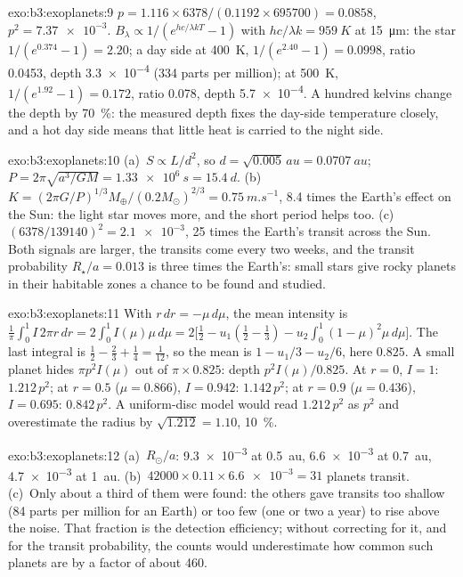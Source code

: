 \begin{solution}{exo:b3:exoplanets:9}
$p = 1.116\times6378/(0.1192\times695700) = 0.0858$, $p^2 = \num{7.37e-3}$.
$B_\lambda \propto 1/(e^{hc/\lambda kT} - 1)$ with $hc/\lambda k =
\qty{959}{K}$ at \qty{15}{\micro m}: the star $1/(e^{0.374} - 1) = 2.20$;
a day side at \qty{400}{K}, $1/(e^{2.40} - 1) = 0.0998$, ratio \num{0.0453},
depth \num{3.3e-4} (334 parts per million); at \qty{500}{K}, $1/(e^{1.92} -
1) = 0.172$, ratio \num{0.078}, depth \num{5.7e-4}. A hundred kelvins
change the depth by \qty{70}{\percent}: the measured depth fixes the
day-side temperature closely, and a hot day side means that little heat
is carried to the night side.
\end{solution}

\begin{solution}{exo:b3:exoplanets:10}
(a)~$S \propto L/d^2$, so $d = \sqrt{0.005}\,\unit{au} = \qty{0.0707}{au}$;
$P = 2\pi\sqrt{a^3/GM} = \qty{1.33e6}{s} = \qty{15.4}{d}$.
(b)~$K = (2\pi G/P)^{1/3}M_\oplus/(0.2M_\odot)^{2/3} = \qty{0.75}{m.s^{-1}}$,
8.4 times the Earth's effect on the Sun: the light star moves more, and
the short period helps too. (c)~$(6378/139140)^2 = \num{2.1e-3}$, 25 times
the Earth's transit across the Sun. Both signals are larger, the transits
come every two weeks, and the transit probability $R_\star/a =
\num{0.013}$ is three times the Earth's: small stars give rocky planets in
their habitable zones a chance to be found and studied.
\end{solution}

\begin{solution}{exo:b3:exoplanets:11}
With $r\,dr = -\mu\,d\mu$, the mean intensity is $\frac1\pi\int_0^1
I\,2\pi r\,dr = 2\int_0^1 I(\mu)\mu\,d\mu = 2\bigl[\tfrac12 - u_1(\tfrac12 -
\tfrac13) - u_2\int_0^1(1 - \mu)^2\mu\,d\mu\bigr]$. The last integral is
$\tfrac12 - \tfrac23 + \tfrac14 = \tfrac1{12}$, so the mean is $1 - u_1/3 -
u_2/6$, here $0.825$. A small planet hides $\pi p^2 I(\mu)$ out of $\pi\times
0.825$: depth $p^2 I(\mu)/0.825$. At $r = 0$, $I = 1$: $1.212\,p^2$; at
$r = 0.5$ ($\mu = 0.866$), $I = 0.942$: $1.142\,p^2$; at $r = 0.9$ ($\mu =
0.436$), $I = 0.695$: $0.842\,p^2$. A uniform-disc model would read
$1.212\,p^2$ as $p^2$ and overestimate the radius by $\sqrt{1.212} = 1.10$,
\qty{10}{\percent}.
\end{solution}

\begin{solution}{exo:b3:exoplanets:12}
(a)~$R_\odot/a$: \num{9.3e-3} at \qty{0.5}{au}, \num{6.6e-3} at
\qty{0.7}{au}, \num{4.7e-3} at \qty{1}{au}. (b)~$42000\times0.11\times
\num{6.6e-3} = 31$ planets transit. (c)~Only about a third of them were
found: the others gave transits too shallow (84 parts per million for
an Earth) or too few (one or two a year) to rise above the noise. That
fraction is the detection efficiency; without correcting for it, and for
the transit probability, the counts would underestimate how common such
planets are by a factor of about 460.
\end{solution}

